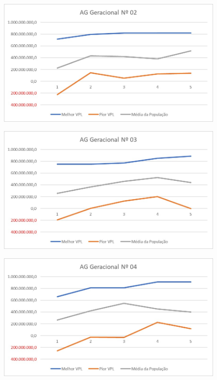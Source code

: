 \documentclass[12pt,a4paper]{report}
\begin{document}
\begin{figure}[H]
\centering

\includegraphics[scale=1]{ApC/AGG/2}

\end{figure}

\begin{figure}[H]
\centering

\includegraphics[scale=1]{ApC/AGG/3}

\end{figure}

\begin{figure}[H]
\centering

\includegraphics[scale=1]{ApC/AGG/4}

\end{figure}
\end{document}
